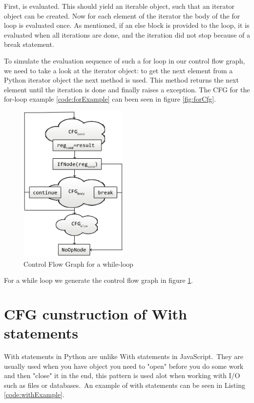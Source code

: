 First,  is evaluated. This should yield an iterable object, such that an iterator object can be created. 
Now for each element of the iterator the body of the for loop is evaluated once. As mentioned, if an else block is provided to the loop, 
it is evaluated when all iterations are done, and the iteration did not stop because of a break statement. 

To simulate the evaluation sequence of such a for loop in our control flow graph, we need to take a look at the iterator object: 
to get the next element from a Python iterator object the next method is used. 
This method returns the next element until the iteration is done and finally raises a  exception. 
The CFG for the for-loop example \ref{code:forExample} can been seen in figure \ref{fig:forCfg}.

\begin{figure}
  \vspace{-20pt}
  \begin{center}
    \includegraphics[width=0.48\textwidth]{images/while.png}
  \end{center}
  \vspace{-10pt}
  \caption{Control Flow Graph for a while-loop}
  \label{fig:whileCfg}
  \vspace{-10pt}
\end{figure}

For a while loop we generate the control flow graph in figure \ref{fig:whileCfg}.

\section{CFG cunstruction of With statements}
With statements in Python are unlike With statements in JavaScript.\ They are usually used when you have object you need to "open" before you do some work and then "close" it in the end, this pattern is used alot when working with I/O such as files or databases.\ An example of with statements can be seen in Listing \ref{code:withExample}.

